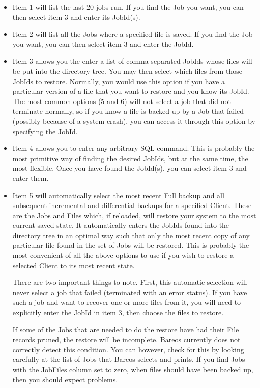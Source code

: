 \begin{itemize}
\item Item 1 will list the last 20 jobs run. If you find the Job you want,
   you can then select item 3 and enter its JobId(s).

\item Item 2 will list all the Jobs where a specified file is saved.  If you
   find the Job you want, you can then select item 3 and enter the JobId.

\item Item 3 allows you the enter a list of comma separated JobIds whose
   files will be put into the directory tree. You may then select which
   files from those JobIds to restore. Normally, you would use this option
   if you have a particular version of a file that you want to restore and
   you know its JobId. The most common options (5 and 6) will not select
   a job that did not terminate normally, so if you know a file is
   backed up by a Job that failed (possibly because of a system crash), you
   can access it through this option by specifying the JobId.

\item Item 4 allows you to enter any arbitrary SQL command.  This is
   probably the most primitive way of finding the desired JobIds, but at
   the same time, the most flexible.  Once you have found the JobId(s), you
   can select item 3 and enter them.

\item Item 5 will automatically select the most recent Full backup and all
   subsequent incremental and differential backups for a specified Client.
   These are the Jobs and Files which, if reloaded, will restore your
   system to the most current saved state.  It automatically enters the
   JobIds found into the directory tree in an optimal way such that only
   the most recent copy of any particular file found in the set of Jobs
   will be restored.  This is probably the most convenient of all the above
   options to use if you wish to restore a selected Client to its most
   recent state.

   There are two important things to note. First, this automatic selection
   will never select a job that failed (terminated with an error status).
   If you have such a job and want to recover one or more files from it,
   you will need to explicitly enter the JobId in item 3, then choose the
   files to restore.

   If some of the Jobs that are needed to do the restore have had their
   File records pruned, the restore will be incomplete. Bareos currently
   does not correctly detect this condition.  You can however, check for
   this by looking carefully at the list of Jobs that Bareos selects and
   prints. If you find Jobs with the JobFiles column set to zero, when
   files should have been backed up, then you should expect problems.


\end{itemize}
